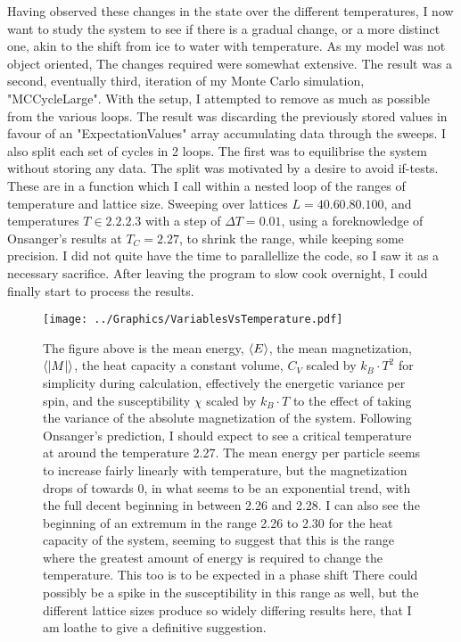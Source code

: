 \documentclass[10pt, twocolumn]{revtex4-1}
\begin{document}
Having observed these changes in the state over the different temperatures, I now want to study the system to see if there is a gradual change, or a more
distinct one, akin to the shift from ice to water with temperature. As my model was not object oriented, The changes required were somewhat extensive. The
result was a second, eventually third, iteration of my Monte Carlo simulation, "MCCycleLarge". With the setup, I attempted to remove as much as possible from
the various loops. The result was discarding the previously stored values in favour of an "ExpectationValues" array accumulating data through the sweeps. I
also split each set of cycles in 2 loops. The first was to equilibrise the system without storing any data. The split was motivated by a desire to avoid
if-tests. These are in a function which I call within a nested loop of the ranges of temperature and lattice size. Sweeping over lattices
$L = \qty{40, 60, 80, 100}$, and temperatures $T \in \qty{2.2, 2.3}$ with a step of $\Delta T = 0.01$, using a foreknowledge of Onsanger's results at
$T_C = 2.27$, to shrink the range, while keeping some precision. I did not quite have the time to parallellize the code, so I saw it as a necessary
sacrifice. After leaving the program to slow cook overnight, I could finally start to process the results.

\begin{figure}[hbtp]
    \texttt{[image: ../Graphics/VariablesVsTemperature.pdf]}
    \caption{The figure above is the mean energy, $\ev{E}$, the mean magnetization, $\ev{|M|}$, the heat capacity a constant volume,
    $C_V$ scaled by $k_B\cdot T^2$ for simplicity during calculation, effectively the energetic variance per spin, and the susceptibility
    $\chi$ scaled by $k_B\cdot T$ to the effect of taking the variance of the absolute magnetization of the system. Following Onsanger's
    prediction, I should expect to see a critical temperature at around the temperature 2.27. The mean energy per particle seems to increase
    fairly linearly with temperature, but the magnetization drops of towards 0, in what seems to be an exponential trend, with the full decent
    beginning in between 2.26 and 2.28. I can also see the beginning of an extremum in the range 2.26 to 2.30 for the heat capacity of the system,
    seeming to suggest that this is the range where the greatest amount of energy is required to change the temperature. This too is to be expected
    in a phase shift There could possibly be a spike in the susceptibility in this range as well, but the different lattice sizes produce so widely
    differing results here, that I am loathe to give a definitive suggestion.}
\label{fig:VarVsTime}
\end{figure}
\end{document}
